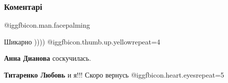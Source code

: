  
 
 
 
 
\subsubsection{Коментарі}

\begin{itemize}
 
 @igg{fbicon.man.facepalming} 

 
Шикарно )))) @igg{fbicon.thumb.up.yellow}{repeat=4} 

\begin{itemize}
 
\textbf{Анна Дианова} соскучилась.

 
\textbf{Титаренко Любовь} и я!!! Скоро вернусь  @igg{fbicon.heart.eyes}{repeat=5} 

 

\end{itemize}
\end{itemize}
